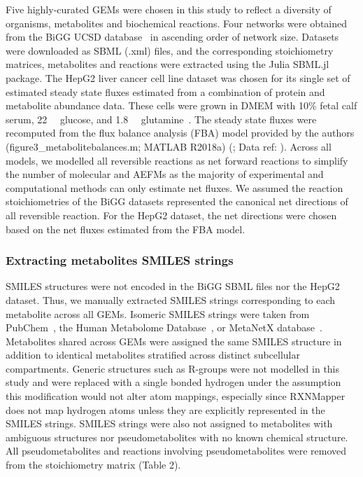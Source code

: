 \documentclass[12pt]{article}
\begin{document}
Five highly-curated GEMs were chosen in this study to reflect a diversity
of organisms, metabolites and biochemical reactions. Four networks were
obtained from the BiGG UCSD database~\citep{KingZacharyA2016BMAp} in
ascending order of network size. Datasets were downloaded as SBML (.xml)
files, and the corresponding stoichiometry matrices, metabolites and
reactions were extracted using the Julia SBML.jl package. The HepG2 liver
cancer cell line dataset was chosen for its single set of estimated steady
state fluxes estimated from a combination of protein and metabolite
abundance data. These cells were grown in DMEM with 10\% fetal calf serum,
22\SI{}{\milli\molar} glucose, and 1.8\SI{}{\milli\molar}
glutamine~\citep{NilssonAvlant2020Qaoa}. The steady state fluxes were
recomputed from the flux balance analysis (FBA) model provided by the
authors (figure3\_metabolitebalances.m; MATLAB R2018a)
(\citealt{NilssonAvlant2020Qaoa}; Data ref:
\citealt{NilssonAvlant2020QaoaDATASET}). Across all models, we modelled
all reversible reactions as net forward reactions to simplify the number
of molecular and AEFMs as the majority of experimental and computational
methods can only estimate net fluxes. We assumed the reaction
stoichiometries of the BiGG datasets represented the canonical net
directions of all reversible reaction. For the HepG2 dataset, the net
directions were chosen based on the net fluxes estimated from the FBA
model.

\subsubsection*{Extracting metabolites SMILES strings}

SMILES structures were not encoded in the BiGG SBML files nor the HepG2
dataset. Thus, we manually extracted SMILES strings corresponding to each
metabolite across all GEMs. Isomeric SMILES strings were taken from
PubChem~\citep{KimSunghwan2023P2u}, the Human Metabolome
Database~\citep{WishartDavidS2022H5tH}, or MetaNetX
database~\citep{MorettiSebastien2021Munf}. Metabolites shared across GEMs
were assigned the same SMILES structure in addition to identical
metabolites stratified across distinct subcellular compartments. Generic
structures such as R-groups were not modelled in this study and were
replaced with a single bonded hydrogen under the assumption this
modification would not alter atom mappings, especially since RXNMapper
does not map hydrogen atoms unless they are explicitly represented in the
SMILES strings. SMILES strings were also not assigned to metabolites with
ambiguous structures nor pseudometabolites with no known chemical
structure. All pseudometabolites and reactions involving pseudometabolites
were removed from the stoichiometry matrix (Table 2).
\end{document}
